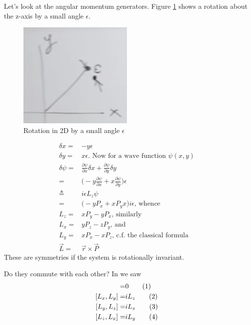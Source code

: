 \documentclass[]{article}
\newcommand\numberthis{\addtocounter{equation}{1}\tag{\theequation}}
\begin{document}
Let's look at the angular momentum generators. Figure \ref{fig:aqm-2-2} shows a  rotation about the z-axis by a small angle $\epsilon$.

\begin{figure}[H]
	\begin{center}
		\caption{Rotation in 2D by a small angle $\epsilon$}\label{fig:aqm-2-2}
		\includegraphics[width=0.5\textwidth]{aqm-2-2}
	\end{center}
\end{figure}

\begin{align*}
	\delta x =& - y \epsilon\\
	\delta y =& x \epsilon \text{. Now for a wave function $\psi(x,y)$}\\
	\delta \psi =& \frac{\partial \psi}{\partial x} \delta x + \frac{\partial \psi}{\partial y} \delta y\\
	=&\big( - y \frac{\partial \psi}{\partial x} + x \frac{\partial \psi}{\partial y}\big) \epsilon\\
	\triangleq& i \epsilon L_z \psi\\
	=& \big(- y P_x + x P_y x\big) i \epsilon \text{, whence}\\
	L_z =& x P_y - y P_x \text{, similarly}\\
	L_x =& y P_z - z P_y \text{, and}\\
	L_y =& x P_x - x P_z \text{, c.f. the classical formula}\\
	\vec{L} =& \vec{r} \times \vec{P}
\end{align*}
These are symmetries if the system is rotationally invariant.

Do they commute with each other? In \cite{susskind2014quantum} we saw
\begin{align*}
	[L,H_i]=& 0 \numberthis \label{eq:LH}\\
	[L_x,L_y] =& i L_z \numberthis \label{eq:lx_ly}\\
	[L_y,L_z] =& i L_x\numberthis \label{eq:ly_lz}\\
	[L_z,L_x] =& i L_y\numberthis \label{eq:lz_lx}
\end{align*}
\end{document}
